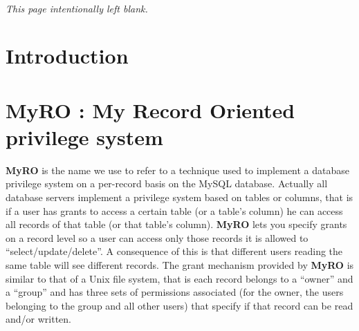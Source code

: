 \documentclass[12pt,titlepage]{article}
\newcommand{\myro}{\textbf{MyRO} }
\begin{document}
\thispagestyle{empty}
~

\vfill
{\it\small This page intentionally left blank.}

\newpage
{}

\tableofcontents

\newpage
{}

\section{Introduction}

\section{\myro: My Record Oriented privilege system}
\myro is the name we use to refer to a technique used to implement a
database privilege system on a per-record basis on the MySQL database.
Actually all database servers implement a privilege system based on
tables or columns, that is if a user has grants to access a certain
table (or a table's column) he can access all records of that table
(or that table's column). \myro lets you specify grants on a record
level so a user can access only those records it is allowed to
``select/update/delete''. A
consequence of this is that different users reading the same table
will see different records. The grant mechanism provided by \myro is
similar to that of a Unix file system, that is each record belongs to
a ``owner'' and a ``group'' and has three sets of permissions
associated (for the owner, the users belonging to the group and all
other users) that specify if that record can be read and/or written.
\end{document}
